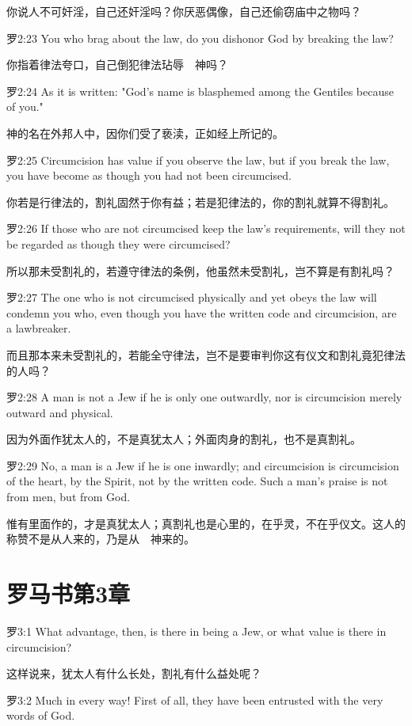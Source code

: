 \documentclass[a4paper,11pt,onecolumn,twoside]{ctexart}
\begin{document}
\begin{multicols}{2}
 你说人不可奸淫，自己还奸淫吗？你厌恶偶像，自己还偷窃庙中之物吗？


 罗2:23
 You who brag about the law, do you dishonor God by breaking the law?

 你指着律法夸口，自己倒犯律法玷辱　神吗？


 罗2:24
 As it is written: "God's name is blasphemed among the Gentiles because of you."

 神的名在外邦人中，因你们受了亵渎，正如经上所记的。


 罗2:25
 Circumcision has value if you observe the law, but if you break the law, you have become as though you had not been circumcised.

 你若是行律法的，割礼固然于你有益；若是犯律法的，你的割礼就算不得割礼。


 罗2:26
 If those who are not circumcised keep the law's requirements, will they not be regarded as though they were circumcised?

 所以那未受割礼的，若遵守律法的条例，他虽然未受割礼，岂不算是有割礼吗？


 罗2:27
 The one who is not circumcised physically and yet obeys the law will condemn you who, even though you have the written code and circumcision, are a lawbreaker.

 而且那本来未受割礼的，若能全守律法，岂不是要审判你这有仪文和割礼竟犯律法的人吗？


 罗2:28
 A man is not a Jew if he is only one outwardly, nor is circumcision merely outward and physical.

 因为外面作犹太人的，不是真犹太人；外面肉身的割礼，也不是真割礼。


 罗2:29
 No, a man is a Jew if he is one inwardly; and circumcision is circumcision of the heart, by the Spirit, not by the written code. Such a man's praise is not from men, but from God.

 惟有里面作的，才是真犹太人；真割礼也是心里的，在乎灵，不在乎仪文。这人的称赞不是从人来的，乃是从　神来的。


 \section{罗马书第3章}
 罗3:1
 What advantage, then, is there in being a Jew, or what value is there in circumcision?

 这样说来，犹太人有什么长处，割礼有什么益处呢？


 罗3:2
 Much in every way! First of all, they have been entrusted with the very words of God.


\end{multicols}
\end{document}

